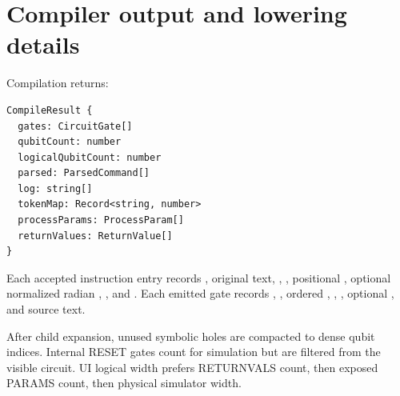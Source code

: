 \section{Compiler output and lowering details}

Compilation returns:
\begin{lstlisting}[language={}]
CompileResult {
  gates: CircuitGate[]
  qubitCount: number
  logicalQubitCount: number
  parsed: ParsedCommand[]
  log: string[]
  tokenMap: Record<string, number>
  processParams: ProcessParam[]
  returnValues: ReturnValue[]
}
\end{lstlisting}

Each accepted instruction entry records , original  text,
, , positional , optional normalized
radian , , and .
Each emitted gate records , , ordered ,
, , optional , and source text.

After child expansion, unused symbolic holes are compacted to dense qubit
indices. Internal RESET gates count for simulation but are filtered from the
visible circuit. UI logical width prefers RETURNVALS count, then exposed PARAMS
count, then physical simulator width.

